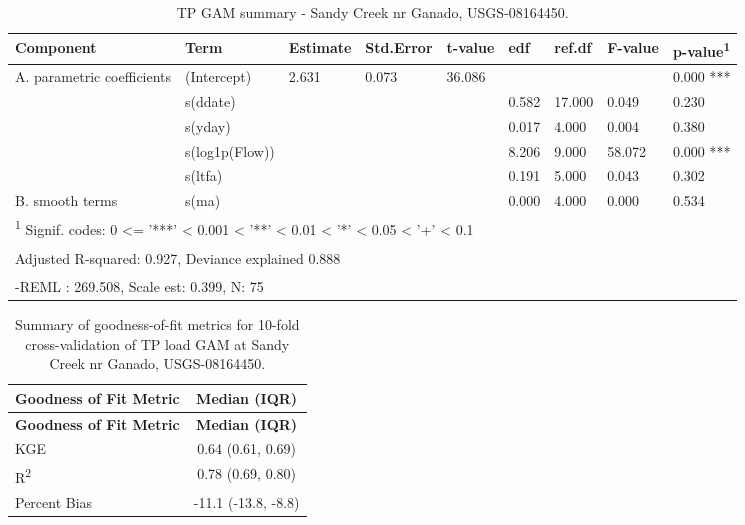 \documentclass[
]{article}
\newenvironment{widestuff}{\begin{table}[h]\begin{adjustwidth}{-4.5cm}{-4.5cm}\centering}{\end{adjustwidth}\end{table}}
\begin{document}
\begin{widestuff}

\caption{TP GAM summary - Sandy Creek nr Ganado, USGS-08164450.}
\centering
\begin{tabular}[t]{lllllllll}
\toprule
Component & Term & Estimate & Std.Error & t-value & edf & ref.df & F-value & p-value\textsuperscript{1}\\
\midrule
A. parametric coefficients & (Intercept) & 2.631 & 0.073 & 36.086 &  &  &  & 0.000 ***\\
\cmidrule{1-9}
 & s(ddate) &  &  &  & 0.582 & 17.000 & 0.049 & 0.230\\

 & s(yday) &  &  &  & 0.017 & 4.000 & 0.004 & 0.380\\

 & s(log1p(Flow)) &  &  &  & 8.206 & 9.000 & 58.072 & 0.000 ***\\

 & s(ltfa) &  &  &  & 0.191 & 5.000 & 0.043 & 0.302\\

\multirow[t]{-5}{*}{\raggedright\arraybackslash B. smooth terms} & s(ma) &  &  &  & 0.000 & 4.000 & 0.000 & 0.534\\
\bottomrule
\multicolumn{9}{l}{\textsuperscript{1} Signif. codes: 0 <= '***' < 0.001 < '**' < 0.01 < '*' < 0.05 < '+' < 0.1}\\
\multicolumn{9}{l}{\textsuperscript{} Adjusted R-squared: 0.927, Deviance explained 0.888}\\
\multicolumn{9}{l}{\textsuperscript{} -REML : 269.508, Scale est: 0.399, N: 75}\\
\end{tabular}
\end{widestuff}

\hypertarget{tbl-TP08164450-CV}{}
\begin{longtable}[]{@{}lc@{}}
\caption{\label{tbl-TP08164450-CV}Summary of goodness-of-fit metrics for
10-fold cross-validation of TP load GAM at Sandy Creek nr Ganado,
USGS-08164450.}\tabularnewline
\toprule()
\textbf{Goodness of Fit Metric} & \textbf{Median (IQR)} \\
\midrule()
\endfirsthead
\toprule()
\textbf{Goodness of Fit Metric} & \textbf{Median (IQR)} \\
\midrule()
\endhead
KGE & 0.64 (0.61, 0.69) \\
R\textsuperscript{2} & 0.78 (0.69, 0.80) \\
Percent Bias & -11.1 (-13.8, -8.8) \\
\bottomrule()
\end{longtable}
\end{document}
